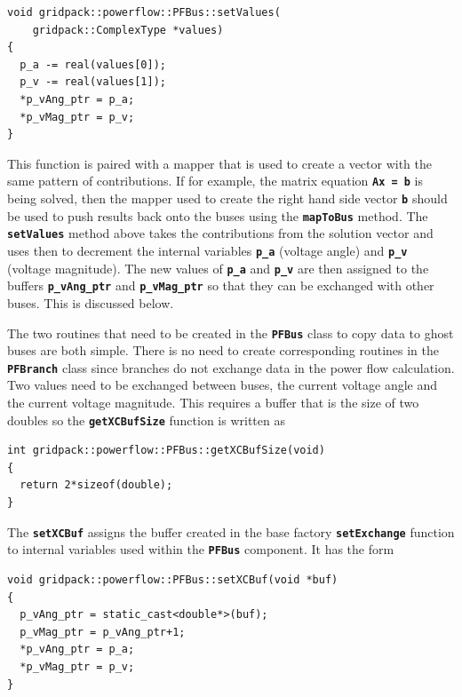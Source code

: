 {
\color{red}
\begin{Verbatim}[fontseries=b]
void gridpack::powerflow::PFBus::setValues(
    gridpack::ComplexType *values)
{
  p_a -= real(values[0]);
  p_v -= real(values[1]);
  *p_vAng_ptr = p_a;
  *p_vMag_ptr = p_v;
}
\end{Verbatim}
}

This function is paired with a mapper that is used to create a vector with the same pattern of contributions. If for example, the matrix equation \texttt{\textbf{Ax = b}} is being solved, then the mapper used to create the right hand side vector \texttt{\textbf{b}} should be used to push results back onto the buses using the \texttt{\textbf{mapToBus}} method. The \texttt{\textbf{setValues}} method above takes the contributions from the solution vector and uses then to decrement the internal variables \texttt{\textbf{p\_a}} (voltage angle) and \texttt{\textbf{p\_v}} (voltage magnitude). The new values of \texttt{\textbf{p\_a}} and \texttt{\textbf{p\_v}} are then assigned to the buffers \texttt{\textbf{p\_vAng\_ptr}} and \texttt{\textbf{p\_vMag\_ptr}} so that they can be exchanged with other buses. This is discussed below.

The two routines that need to be created in the \texttt{\textbf{PFBus}} class to copy data to ghost buses are both simple. There is no need to create corresponding routines in the \texttt{\textbf{PFBranch}} class since branches do not exchange data in the power flow calculation. Two values need to be exchanged between buses, the current voltage angle and the current voltage magnitude. This requires a buffer that is the size of two doubles so the \texttt{\textbf{getXCBufSize}} function is written as

{
\color{red}
\begin{Verbatim}[fontseries=b]
int gridpack::powerflow::PFBus::getXCBufSize(void)
{
  return 2*sizeof(double);
}
\end{Verbatim}
}

The \texttt{\textbf{setXCBuf}} assigns the buffer created in the base factory \texttt{\textbf{setExchange}} function to internal variables used within the \texttt{\textbf{PFBus}} component. It has the form

{
\color{red}
\begin{Verbatim}[fontseries=b]
void gridpack::powerflow::PFBus::setXCBuf(void *buf)
{
  p_vAng_ptr = static_cast<double*>(buf);
  p_vMag_ptr = p_vAng_ptr+1;
  *p_vAng_ptr = p_a;
  *p_vMag_ptr = p_v;
}
\end{Verbatim}
}

